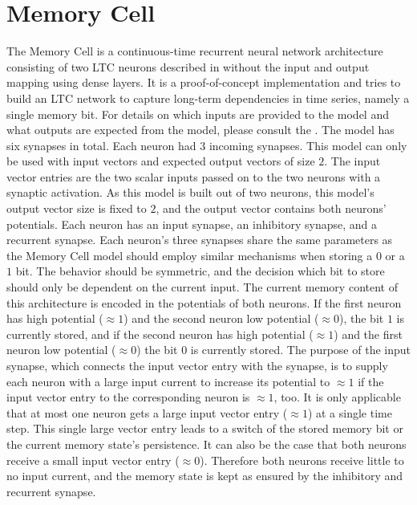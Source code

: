 \documentclass[draft,final]{vutinfth} %
\begin{document}
    \section{Memory Cell} \label{memory_cell}
    The Memory Cell is a continuous-time recurrent neural network architecture consisting of two LTC neurons described in  without the input and output mapping using dense layers.
    It is a proof-of-concept implementation and tries to build an LTC network \cite{LTCNetworks} to capture long-term dependencies in time series, namely a single memory bit.
    For details on which inputs are provided to the model and what outputs are expected from the model, please consult the .
    The model has six synapses in total. Each neuron had $3$ incoming synapses.
    This model can only be used with input vectors and expected output vectors of size $2$.
    The input vector entries are the two scalar inputs passed on to the two neurons with a synaptic activation.
    As this model is built out of two neurons, this model's output vector size is fixed to $2$, and the output vector contains both neurons' potentials.
    Each neuron has an input synapse, an inhibitory synapse, and a recurrent synapse.
    Each neuron's three synapses share the same parameters as the Memory Cell model should employ similar mechanisms when storing a $0$ or a $1$ bit.
    The behavior should be symmetric, and the decision which bit to store should only be dependent on the current input.
    The current memory content of this architecture is encoded in the potentials of both neurons.
    If the first neuron has high potential ($\approx 1$) and the second neuron low potential ($\approx 0$), the bit $1$ is currently stored, and if the second neuron has high potential ($\approx 1$) and the first neuron low potential ($\approx 0$) the bit $0$ is currently stored.
    The purpose of the input synapse, which connects the input vector entry with the synapse, is to supply each neuron with a large input current to increase its potential to $\approx 1$ if the input vector entry to the corresponding neuron is $\approx 1$, too.
    It is only applicable that at most one neuron gets a large input vector entry ($\approx 1$) at a single time step.
    This single large vector entry leads to a switch of the stored memory bit or the current memory state's persistence.
    It can also be the case that both neurons receive a small input vector entry ($\approx 0$). Therefore both neurons receive little to no input current, and the memory state is kept as ensured by the inhibitory and recurrent synapse.
\end{document}
